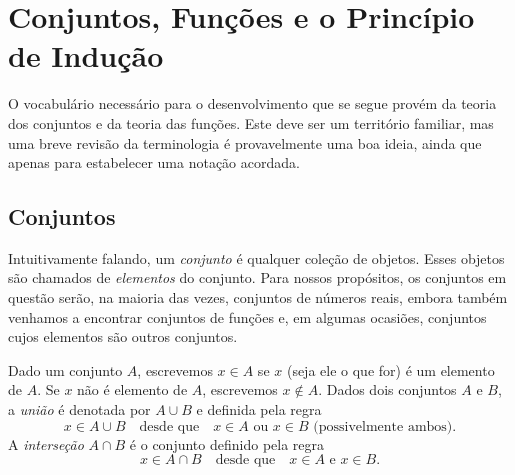 \section{Conjuntos, Funções e o Princípio de Indução}\label{sec:preliminares}

O vocabulário necessário para o desenvolvimento que se segue provém da teoria dos conjuntos e da teoria das funções. Este deve ser um território familiar, mas uma breve revisão da terminologia é provavelmente uma boa ideia, ainda que apenas para estabelecer uma notação acordada.

\subsection{Conjuntos}\label{subsec:conjuntos}

Intuitivamente falando, um \textit{conjunto} é qualquer coleção de objetos. Esses objetos são chamados de \textit{elementos} do conjunto. Para nossos propósitos, os conjuntos em questão serão, na maioria das vezes, conjuntos de números reais, embora também venhamos a encontrar conjuntos de funções e, em algumas ocasiões, conjuntos cujos elementos são outros conjuntos.  

Dado um conjunto $A$, escrevemos $x \in A$ se $x$ (seja ele o que for) é um elemento de $A$. Se $x$ não é elemento de $A$, escrevemos $x \notin A$. Dados dois conjuntos $A$ e $B$, a \textit{união} é denotada por $A \cup B$ e definida pela regra 
\[
x \in A \cup B \quad \text{desde que} \quad x \in A \text{ ou } x \in B \text{ (possivelmente ambos)}.
\]
A \textit{interseção} $A \cap B$ é o conjunto definido pela regra 
\[
x \in A \cap B \quad \text{desde que} \quad x \in A \text{ e } x \in B.
\]

